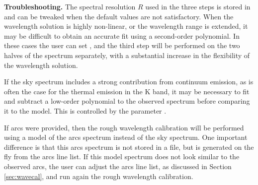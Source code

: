 \documentclass[a4paper]{article}
\begin{document}
\begin{sloppypar}
\medskip
\noindent
\textbf{Troubleshooting.} The spectral resolution $R$ used in the three steps is stored in  and can be tweaked when the default values are not satisfactory. When the wavelength solution is highly non-linear, or the wavelength range is extended, it may be difficult to obtain an accurate fit using a second-order polynomial. In these cases the user can set , and the third step will be performed on the two halves of the spectrum separately, with a substantial increase in the flexibility of the wavelength solution.

If the sky spectrum includes a strong contribution from continuum emission, as is often the case for the thermal emission in the K band, it may be necessary to fit and subtract a low-order polynomial to the observed spectrum before comparing it to the model. This is controlled by the parameter .

If arcs were provided, then the rough wavelength calibration will be performed using a model of the arcs spectrum instead of the sky spectrum. One important difference is that this arcs spectrum is not stored in a file, but is generated on the fly from the arcs line list. If this model spectrum does not look similar to the observed arcs, the user can adjust the arcs line list, as discussed in Section \ref{sec:wavecal}, and run again the rough wavelength calibration.



\end{sloppypar}
\end{document}

